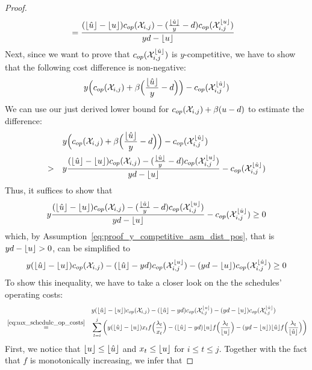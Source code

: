 \begin{proof}
\begin{align*}
	&=\frac{(\lfloor\hat{u}\rfloor-\lfloor u\rfloor)c_{op}(\mathcal{X}_{i,j})-(\frac{\lfloor\hat{u}\rfloor}{y}-d)c_{op}(\mathcal{X}_{i,j}^{\lfloor u\rfloor})}{yd-\lfloor u\rfloor}
\end{align*}
Next, since we want to prove that $c_{op}(\mathcal{X}_{i,j}^{\lfloor\hat{u}\rfloor})$ is $y$-competitive, we have to show that the following cost difference is non-negative:
\begin{align*}
	y\Bigl(c_{op}(\mathcal{X}_{i,j})+\beta\Bigl(\frac{\lfloor\hat{u}\rfloor}{y}-d\Bigr)\Bigr)-c_{op}(\mathcal{X}_{i,j}^{\lfloor\hat{u}\rfloor})
\end{align*}
We can use our just derived lower bound for $c_{op}(\mathcal{X}_{i,j})+\beta(u-d)$ to estimate the difference:
\begin{align*}
	&y\Bigl(c_{op}(\mathcal{X}_{i,j})+\beta\Bigl(\frac{\lfloor\hat{u}\rfloor}{y}-d\Bigr)\Bigr)-c_{op}(\mathcal{X}_{i,j}^{\lfloor\hat{u}\rfloor})\\
	>\quad&y\frac{(\lfloor\hat{u}\rfloor-\lfloor u\rfloor)c_{op}(\mathcal{X}_{i,j})-(\frac{\lfloor\hat{u}\rfloor}{y}-d)c_{op}(\mathcal{X}_{i,j}^{\lfloor u\rfloor})}{yd-\lfloor u\rfloor}-c_{op}(\mathcal{X}_{i,j}^{\lfloor\hat{u}\rfloor})
\end{align*}
Thus, it suffices to show that
\begin{align*}
	y\frac{(\lfloor\hat{u}\rfloor-\lfloor u\rfloor)c_{op}(\mathcal{X}_{i,j})-(\frac{\lfloor\hat{u}\rfloor}{y}-d)c_{op}(\mathcal{X}_{i,j}^{\lfloor u\rfloor})}{yd-\lfloor u\rfloor}-c_{op}(\mathcal{X}_{i,j}^{\lfloor\hat{u}\rfloor})\ge 0
\end{align*}
which, by Assumption~\eqref{eq:proof_y_competitive_asm_dist_pos}, that is $yd-\lfloor u\rfloor>0$, can be simplified to
\begin{equation*}
	y(\lfloor\hat{u}\rfloor-\lfloor u\rfloor)c_{op}(\mathcal{X}_{i,j})-(\lfloor\hat{u}\rfloor-yd)c_{op}(\mathcal{X}_{i,j}^{\lfloor u\rfloor})-(yd-\lfloor u\rfloor)c_{op}(\mathcal{X}_{i,j}^{\lfloor\hat{u}\rfloor})\ge 0
\end{equation*}
To show this inequality, we have to take a closer look on the the schedules' operating costs:
\begin{align*}
	&&&y(\lfloor\hat{u}\rfloor-\lfloor u\rfloor)c_{op}(\mathcal{X}_{i,j})-(\lfloor\hat{u}\rfloor-yd)c_{op}(\mathcal{X}_{i,j}^{\lfloor u\rfloor})-(yd-\lfloor u\rfloor)c_{op}(\mathcal{X}_{i,j}^{\lfloor\hat{u}\rfloor})\\
	&\stackrel{\eqref{eq:mx_schedule_op_costs}}{=}&&\sum\limits_{t=i}^j\left(y(\lfloor\hat{u}\rfloor-\lfloor u\rfloor)x_tf\Bigl(\frac{\lambda_t}{x_t}\Bigr)-(\lfloor\hat{u}\rfloor-yd)\lfloor u\rfloor f\Bigl(\frac{\lambda_t}{\lfloor u\rfloor}\Bigr)-(yd-\lfloor u\rfloor)\lfloor\hat{u}\rfloor f\Bigl(\frac{\lambda_t}{\lfloor\hat{u}\rfloor}\Bigr)\right)
\end{align*}
First, we notice that $\lfloor u\rfloor\le\lfloor\hat{u}\rfloor$ and $x_t\le\lfloor u\rfloor$ for $i\le t\le j$. Together with the fact that $f$ is monotonically increasing, we infer that

\end{proof}
